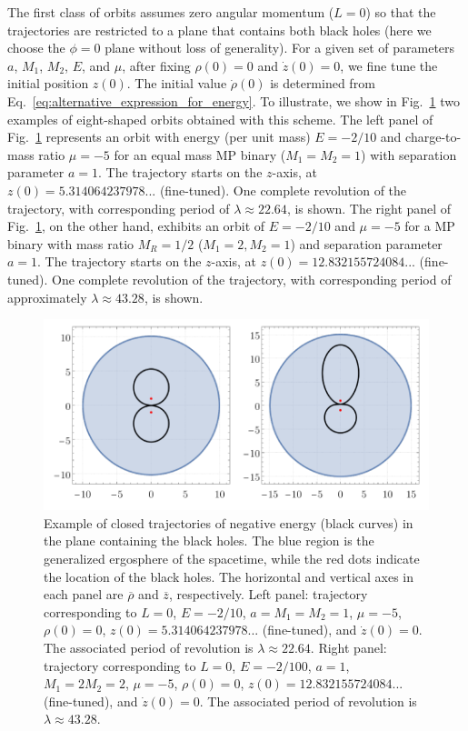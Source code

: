 The first class of orbits assumes zero angular momentum ($L=0$) so that the trajectories are restricted to a plane that contains both black holes (here we choose the $\phi=0$ plane without loss of generality). For a given set of parameters $a$, $M_1$, $M_2$, $E$, and $\mu$, after fixing $\rho(0) = 0$ and $\dot{z}(0) = 0$, we fine tune the initial position $z(0)$. The initial value $\dot{\rho} (0)$ is determined from Eq.~\eqref{eq:alternative_expression_for_energy}. To illustrate, we show in Fig.~\ref{fig:orbit_closed_bh} two examples of eight-shaped orbits obtained with this scheme. The left panel of Fig.~\ref{fig:orbit_closed_bh} represents an orbit with energy (per unit mass) $E=-2/10$ and charge-to-mass ratio $\mu=-5$ for an equal mass MP binary ($M_1=M_2=1$) with separation parameter $a=1$. The trajectory starts on the $z$-axis, at $z(0) = 5.314064237978...$ (fine-tuned). One complete revolution of the trajectory, with corresponding period of $\lambda \approx 22.64$, is shown. The right panel of Fig.~\ref{fig:orbit_closed_bh}, on the other hand, exhibits an orbit of $E=-2/10$ and $\mu=-5$ for a MP binary with mass ratio $M_R=1/2$ ($M_1=2,M_2=1$) and separation parameter $a=1$. The trajectory starts on the $z$-axis, at $z(0) = 12.832155724084...$ (fine-tuned). One complete revolution of the trajectory, with corresponding period of approximately $\lambda \approx 43.28$, is shown.



\begin{figure}[!htbp]
    \centering
    \includegraphics[scale=0.70]{img/penrose_binaries/fig4.pdf}
    \caption{Example of closed trajectories of negative energy (black curves) in the plane containing the black holes. The blue region is the generalized ergosphere of the spacetime, while the red dots indicate the location of the black holes. The horizontal and vertical axes in each panel are $\overline \rho$ and $\overline z$, respectively. Left panel: trajectory corresponding to $L=0$, $E=-2/10$, $a=M_1=M_2=1$, $\mu = -5$, $\rho(0) = 0$, $z(0) = 5.314064237978...$ (fine-tuned), and $\dot{z}(0) = 0$. The associated period of revolution is $\lambda \approx 22.64$.  Right panel: trajectory corresponding to $L=0$, $E=-2/100$, $a=1$, $M_1=2 M_2= 2$, $\mu = -5$, $\rho(0) = 0$, $z(0) = 12.832155724084...$ (fine-tuned), and $\dot{z}(0) = 0$. The associated period of revolution is $\lambda \approx 43.28$. }
    \label{fig:orbit_closed_bh}
\end{figure}


